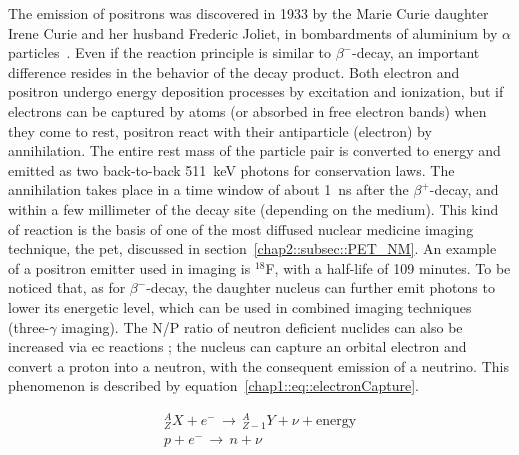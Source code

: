 The emission of positrons was discovered in 1933 by the Marie Curie daughter Irene Curie and her husband Frederic Joliet, in bombardments of aluminium by $\alpha$ particles~\parencite{Leone2010}. Even if the reaction principle is similar to $\beta^-$-decay, an important difference resides in the behavior of the decay product. Both electron and positron undergo energy deposition processes by excitation and ionization, but if electrons can be captured by atoms (or absorbed in free electron bands) when they come to rest, positron react with their antiparticle (electron) by annihilation. The entire rest mass of the particle pair is converted to energy and emitted as two back-to-back 511~keV photons for conservation laws. The annihilation takes place in a time window of about 1~ns after the $\beta^+$-decay, and within a few millimeter of the decay site (depending on the medium). This kind of reaction is the basis of one of the most diffused nuclear medicine imaging technique, the \gls{pet}, discussed in section~\ref{chap2::subsec::PET_NM}. An example of a positron emitter used in imaging is $^{18}$F, with a half-life of 109 minutes.
To be noticed that, as for $\beta^-$-decay, the daughter nucleus can further emit photons to lower its energetic level, which can be used in combined imaging techniques (three-$\gamma$ imaging).
The N/P ratio of neutron deficient nuclides can also be increased via \gls{ec} reactions ; the nucleus can capture an orbital electron and convert a proton into a neutron, with the consequent emission of a neutrino. This phenomenon is described by equation~\ref{chap1::eq::electronCapture}.

 \begin{equation}\label{chap1::eq::electronCapture}
\begin{split}
^{A}_{Z}X + e^{-} \, \rightarrow \, ^{A}_{Z-1}Y  + \nu + \mathrm{energy} \\
p + e^{-}\, \rightarrow \, n  + \nu 
\end{split}
\end{equation}     

